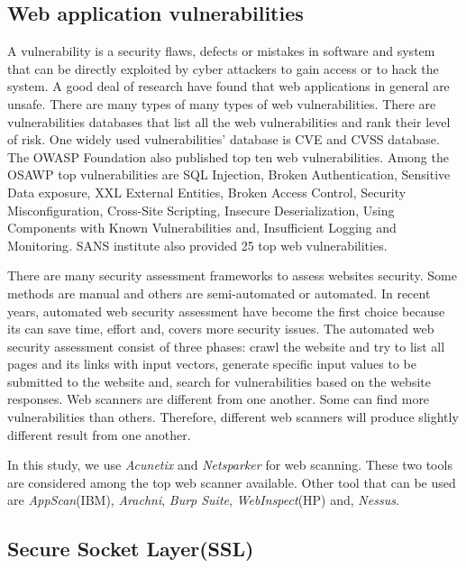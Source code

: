 \documentclass[conference]{IEEEtran}
\begin{document}
\subsection{Web application vulnerabilities}

A vulnerability is a security flaws, defects or mistakes in software and system that can be directly exploited by cyber attackers to gain access or to hack the system\cite{awang2014survey}\cite{srinivasan2017web}. A good deal of research have found that web applications in general are unsafe\cite{alsmadi2016government}\cite{antunes2014penetration}. There are many types of many types of web vulnerabilities. There are vulnerabilities databases that list all the web vulnerabilities and rank their level of risk. One widely used vulnerabilities' database is CVE and CVSS database\cite{mell2006common}. The OWASP Foundation also published top ten web vulnerabilities\cite{bertino2017botnets}. Among the OSAWP top vulnerabilities are SQL Injection, Broken Authentication, Sensitive Data exposure, XXL External Entities, Broken Access Control, Security Misconfiguration, Cross-Site Scripting, Insecure Deserialization, Using Components with Known Vulnerabilities and, Insufficient Logging and Monitoring\cite{owasp10application}. SANS institute also provided 25 top web vulnerabilities\cite{scholte2012have}.

There are many security assessment frameworks to assess websites security. Some methods are manual and others are semi-automated or automated. In recent years, automated web security assessment have become the first choice because its can save time, effort and, covers more security issues. The automated web security assessment consist of three phases: crawl the website and try to list all pages and its links with input vectors, generate specific input values to be submitted to the website and, search for vulnerabilities based on the website responses\cite{munoz2013methods}.
Web scanners are different from one another. Some can find more vulnerabilities than others. Therefore, different web scanners will produce slightly different result from one another.

In this study, we use \emph{Acunetix} and \emph{Netsparker} for web scanning. These two tools are considered among the top web scanner available. Other tool that can be used are \emph{AppScan}(IBM), \emph{Arachni}, \emph{Burp Suite}, \emph{WebInspect}(HP) and, \emph{Nessus}\cite{makino2015evaluation}\cite{roldan2017comparison}.

\subsection{Secure Socket Layer(SSL)}
\end{document}
